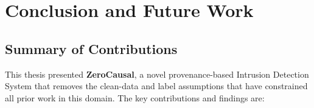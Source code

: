 \chapter{Conclusion and Future Work}
\label{ch:conclusion}

\section{Summary of Contributions}

This thesis presented \textbf{ZeroCausal}, a novel provenance-based Intrusion Detection System that removes the clean-data and label assumptions that have constrained all prior work in this domain. The key contributions and findings are:

